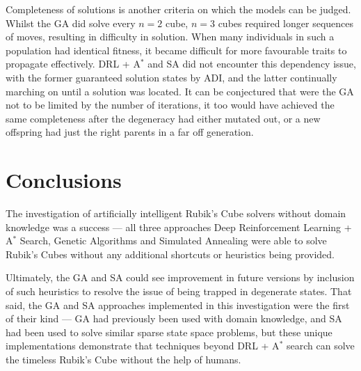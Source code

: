 \documentclass[UKenglish]{svproc}
\begin{document}
Completeness of solutions is another criteria on which the models can be judged. Whilst the GA did solve every $n=2$ cube, $n=3$ cubes required longer sequences of moves, resulting in difficulty in solution. When many individuals in such a population had identical fitness, it became difficult for more favourable traits to propagate effectively. DRL + A$^{\ast}$ and SA did not encounter this dependency issue, with the former guaranteed solution states by ADI, and the latter continually marching on until a solution was located. It can be conjectured that were the GA not to be limited by the number of iterations, it too would have achieved the same completeness after the degeneracy had either mutated out, or a new offspring had just the right parents in a far off generation.

\section{Conclusions}
The investigation of artificially intelligent Rubik's Cube solvers without domain knowledge was a success --- all three approaches Deep Reinforcement Learning + A$^{\ast}$ Search, Genetic Algorithms and Simulated Annealing were able to solve Rubik's Cubes without any additional shortcuts or heuristics being provided.

Ultimately, the GA and SA could see improvement in future versions by inclusion of such heuristics to resolve the issue of being trapped in degenerate states. That said, the GA and SA approaches implemented in this investigation were the first of their kind --- GA had previously been used with domain knowledge, and SA had been used to solve similar sparse state space problems, but these unique implementations demonstrate that techniques beyond DRL + A$^{\ast}$ search can solve the timeless Rubik's Cube without the help of humans.

\clearpage
\printbibliography
\end{document}
